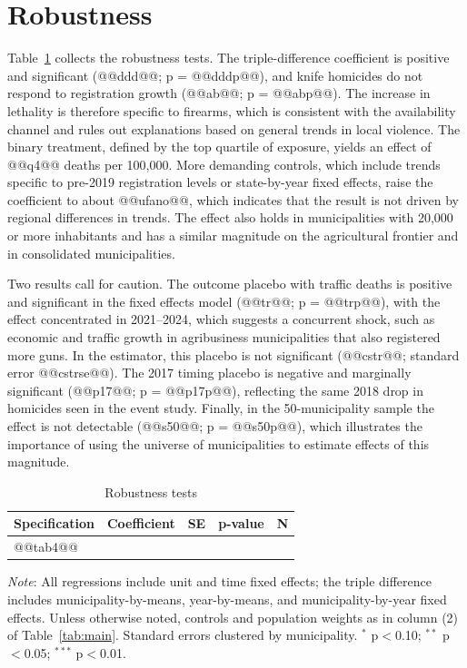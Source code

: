 \documentclass[11pt,a4paper]{article}
\newcommand{\nota}[1]{\par\vspace{2pt}\begin{minipage}{\linewidth}\footnotesize\textit{Note}: #1\end{minipage}}
\begin{document}
\section{Robustness}\label{sec:robustez}

Table~\ref{tab:rob} collects the robustness tests. The triple-difference coefficient is positive and significant (@@ddd@@; p = @@dddp@@), and knife homicides do not respond to registration growth (@@ab@@; p = @@abp@@). The increase in lethality is therefore specific to firearms, which is consistent with the availability channel and rules out explanations based on general trends in local violence. The binary treatment, defined by the top quartile of exposure, yields an effect of @@q4@@ deaths per 100,000. More demanding controls, which include trends specific to pre-2019 registration levels or state-by-year fixed effects, raise the coefficient to about @@ufano@@, which indicates that the result is not driven by regional differences in trends. The effect also holds in municipalities with 20,000 or more inhabitants and has a similar magnitude on the agricultural frontier and in consolidated municipalities.

Two results call for caution. The outcome placebo with traffic deaths is positive and significant in the fixed effects model (@@tr@@; p = @@trp@@), with the effect concentrated in 2021--2024, which suggests a concurrent shock, such as economic and traffic growth in agribusiness municipalities that also registered more guns. In the \citet{callaway2021} estimator, this placebo is not significant (@@cstr@@; standard error @@cstrse@@). The 2017 timing placebo is negative and marginally significant (@@p17@@; p = @@p17p@@), reflecting the same 2018 drop in homicides seen in the event study. Finally, in the 50-municipality sample the effect is not detectable (@@s50@@; p = @@s50p@@), which illustrates the importance of using the universe of municipalities to estimate effects of this magnitude.

\begin{table}[H]
\centering\small
\caption{Robustness tests}\label{tab:rob}
\begin{tabular}{lcccc}
\toprule
Specification & Coefficient & SE & p-value & N \\
\midrule
@@tab4@@
\bottomrule
\end{tabular}
\nota{All regressions include unit and time fixed effects; the triple difference includes municipality-by-means, year-by-means, and municipality-by-year fixed effects. Unless otherwise noted, controls and population weights as in column (2) of Table~\ref{tab:main}. Standard errors clustered by municipality. $^{*}$ p$<$0.10; $^{**}$ p$<$0.05; $^{***}$ p$<$0.01.}
\end{table}
\end{document}

